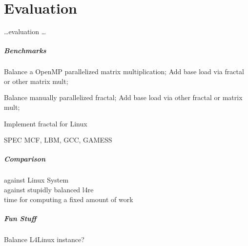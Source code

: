 \chapter{Evaluation}
\label{sec:evaluation}


\ldots evaluation \ldots


\paragraph{Benchmarks}
Balance a OpenMP parallelized matrix multiplication;
Add base load via fractal or other matrix mult;

Balance manually parallelized fractal;
Add base load via other fractal or matrix mult;

Implement fractal for Linux

SPEC MCF, LBM, GCC, GAMESS

\paragraph{Comparison} 
  against Linux System \\
  against stupidly balanced l4re \\
  time for computing a fixed amount of work \\

\paragraph{Fun Stuff}
Balance L4Linux instance?



\cleardoublepage

